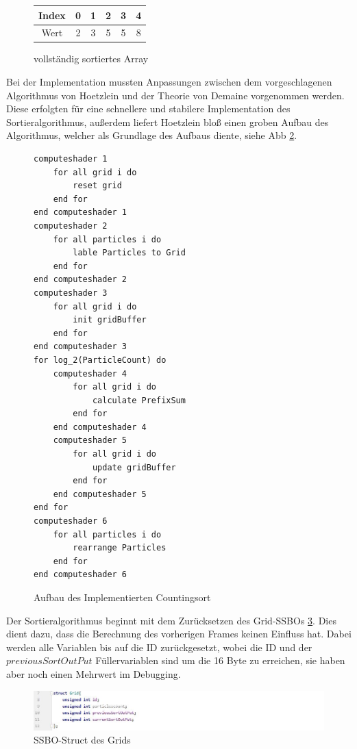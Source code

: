 \documentclass[intern,palatino]{cgBA}
\begin{document}
\begin{figure}[H]
	\centering
	\begin{tabular}{ | c || c | c | c | c | c |}
		\hline
		Index 				&  0 & 1 & 2 & 3 & 4 \\ \hline
		Wert				&  2 & 3 & 5 & 5 & 8 \\
		\hline
	\end{tabular}
	\caption{vollständig sortiertes Array}
	\label{tab:Counting4}
\end{figure}


Bei der Implementation mussten Anpassungen zwischen dem vorgeschlagenen Algorithmus von Hoetzlein \cite{nvidia} und der Theorie von Demaine \cite{counting} vorgenommen werden. Diese erfolgten für eine schnellere und stabilere Implementation des Sortieralgorithmus, außerdem liefert Hoetzlein bloß einen groben Aufbau des Algorithmus, welcher als Grundlage des Aufbaus diente, siehe Abb \ref{code:Counting}.
\newline

\begin{figure}[H]
	\centering
	\begin{lstlisting}
computeshader 1
	for all grid i do
		reset grid
	end for
end computeshader 1
computeshader 2
	for all particles i do
		lable Particles to Grid
	end for
end computeshader 2
computeshader 3
	for all grid i do
		init gridBuffer
	end for
end computeshader 3
for log_2(ParticleCount) do
	computeshader 4
		for all grid i do
			calculate PrefixSum
		end for
	end computeshader 4
	computeshader 5
		for all grid i do
			update gridBuffer
		end for
	end computeshader 5
end for
computeshader 6
	for all particles i do
		rearrange Particles
	end for
end computeshader 6
	\end{lstlisting}
	\caption{Aufbau des Implementierten Countingsort}
	\label{code:Counting}
\end{figure}

Der Sortieralgorithmus beginnt mit dem Zurücksetzen des Grid-SSBOs \ref{img:GridStruct}. Dies dient dazu, dass die  Berechnung des vorherigen Frames keinen Einfluss hat. Dabei werden alle Variablen bis auf die ID zurückgesetzt, wobei die ID und der $previousSortOutPut$ Füllervariablen sind um die 16 Byte zu erreichen, sie haben aber noch einen Mehrwert im Debugging.

\begin{figure}[H]
	\centering
	\includegraphics[width=1.3\columnwidth]{Bilder/GridStruct.jpg}
	\caption{SSBO-Struct des Grids}
	\label{img:GridStruct}
\end{figure}
\end{document}
